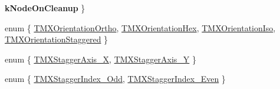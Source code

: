 \begin{DoxyCompactItemize}
\newline
{\bfseries k\+Node\+On\+Cleanup}
 \}
\item 
enum \{ \hyperlink{group____2d_ggaf6d61abedd58f4942675f955a24a642ba6e605dfb7c2c2feae0c28597a7e5bf33}{T\+M\+X\+Orientation\+Ortho}, 
\hyperlink{group____2d_ggaf6d61abedd58f4942675f955a24a642babc4f9eb49e1e2819fbd0009bb0748652}{T\+M\+X\+Orientation\+Hex}, 
\hyperlink{group____2d_ggaf6d61abedd58f4942675f955a24a642ba0584ce842cf448823601c495b428302a}{T\+M\+X\+Orientation\+Iso}, 
\hyperlink{group____2d_ggaf6d61abedd58f4942675f955a24a642ba7bc6f3f47d73bb8d55469314412d2c8f}{T\+M\+X\+Orientation\+Staggered}
 \}
\item 
enum \{ \hyperlink{group____2d_ggad1df9dc2600f2dda7e99d31c00fd73e0a144f1dacc945aeaed93bfa0c97febaad}{T\+M\+X\+Stagger\+Axis\+\_\+X}, 
\hyperlink{group____2d_ggad1df9dc2600f2dda7e99d31c00fd73e0a0e2dd404e5125c2bbd4ddf90827beca4}{T\+M\+X\+Stagger\+Axis\+\_\+Y}
 \}
\item 
enum \{ \hyperlink{group____2d_gga4eeeead548222804e141df8f1b205ca8a5a499a035916d3408262fe103cc830a2}{T\+M\+X\+Stagger\+Index\+\_\+\+Odd}, 
\hyperlink{group____2d_gga4eeeead548222804e141df8f1b205ca8a3943e33b77c96b43bf6bc2f9ca0b2120}{T\+M\+X\+Stagger\+Index\+\_\+\+Even}
 \}
\end{DoxyCompactItemize}
